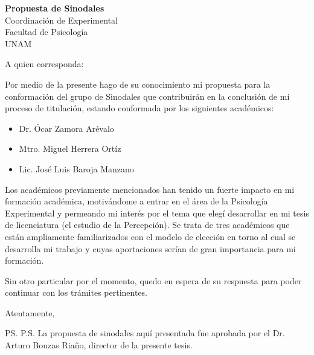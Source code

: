 \documentclass[10pt]{letter} %
\begin{document}

\begin{letter}{\textbf{Propuesta de Sinodales} \\ Coordinación de Experimental \\ Facultad de Psicología \\ UNAM} %


\opening{A quien corresponda:}

Por medio de la presente hago de su conocimiento mi propuesta para la conformación del grupo de Sinodales que contribuirán en la conclusión de mi proceso de titulación, estando conformada por los siguientes académicos:\\

\begin{itemize}
\item Dr. Ócar Zamora Arévalo\\

\item Mtro. Miguel Herrera Ortíz\\

\item Lic. José Luis Baroja Manzano\\
\end{itemize}

Los académicos previamente mencionados han tenido un fuerte impacto en mi formación académica, motivándome a entrar en el área de la Psicología Experimental y permeando mi interés por el tema que elegí desarrollar en mi tesis de licenciatura (el estudio de la Percepción). Se trata de tres académicos que están ampliamente familiarizados con el modelo de elección en torno al cual se desarrolla mi trabajo y cuyas aportaciones serían de gran importancia para mi formación.

Sin otro particular por el momento, quedo en espera de su respuesta para poder continuar con los trámites pertinentes.

\vspace{2\parskip} %
\closing{Atentamente,}
\vspace{2\parskip} %

\ps{P.S. La propuesta de sinodales aquí presentada fue aprobada por el Dr. Arturo Bouzas Riaño, director de la presente tesis.} %



\end{letter}
 
\end{document}
